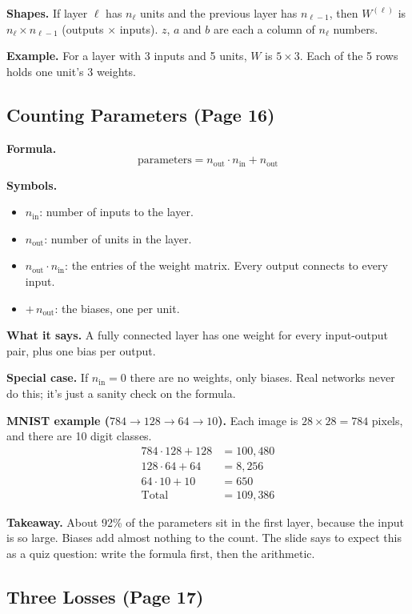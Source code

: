 \textbf{Shapes.} If layer $\ell$ has $n_\ell$ units and the previous layer has $n_{\ell-1}$, then $W^{(\ell)}$ is $n_\ell \times n_{\ell-1}$ (outputs $\times$ inputs). $z$, $a$ and $b$ are each a column of $n_\ell$ numbers.

\textbf{Example.} For a layer with 3 inputs and 5 units, $W$ is $5\times 3$. Each of the 5 rows holds one unit's 3 weights.

\subsection*{Counting Parameters (Page 16)}

\textbf{Formula.}
\[
\text{parameters} = n_{\text{out}} \cdot n_{\text{in}} + n_{\text{out}}
\]

\textbf{Symbols.}
\begin{itemize}
  \item $n_{\text{in}}$: number of inputs to the layer.
  \item $n_{\text{out}}$: number of units in the layer.
  \item $n_{\text{out}} \cdot n_{\text{in}}$: the entries of the weight matrix. Every output connects to every input.
  \item $+\,n_{\text{out}}$: the biases, one per unit.
\end{itemize}

\textbf{What it says.} A fully connected layer has one weight for every input-output pair, plus one bias per output.

\textbf{Special case.} If $n_{\text{in}} = 0$ there are no weights, only biases. Real networks never do this; it's just a sanity check on the formula.

\textbf{MNIST example ($784 \to 128 \to 64 \to 10$).} Each image is $28\times 28 = 784$ pixels, and there are 10 digit classes.
\begin{align*}
784 \cdot 128 + 128 &= 100{,}480\\
128 \cdot 64 + 64 &= 8{,}256\\
64 \cdot 10 + 10 &= 650\\
\text{Total} &= 109{,}386
\end{align*}

\textbf{Takeaway.} About 92\% of the parameters sit in the first layer, because the input is so large. Biases add almost nothing to the count. The slide says to expect this as a quiz question: write the formula first, then the arithmetic.

\subsection*{Three Losses (Page 17)}

